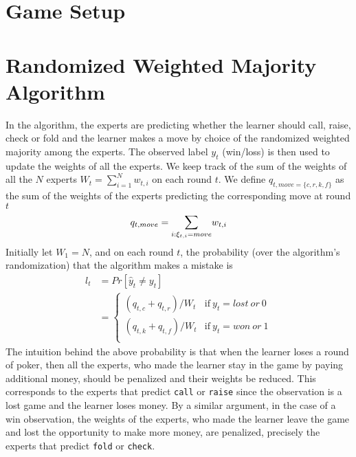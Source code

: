\documentclass[12pt]{article}
\begin{document}
\section{Game Setup}

\section{Randomized Weighted Majority Algorithm}
\label{sec:rwma}
\noindent In the algorithm, the experts are predicting whether the learner should call, raise, check
or fold and the learner makes a move by choice of the randomized weighted majority
among the experts. The observed label $y_t$ (win/loss) is then used to update
the weights of all the experts. We keep track of the sum of the weights of all the $N$ experts $W_t =
\sum_{i=1}^Nw_{t,i}$ on each round $t$. We define $q_{t,move=\{c,r,k,f\}}$ as the sum of the weights
of the experts predicting the corresponding move at round $t$ \ie \[q_{t,move}=\Sum_{i:\xi_{t,i}=move}w_{t,i}\]
Initially let $W_1 = N$,
and on each round $t$, the probability (over the algorithm's randomization) that the algorithm makes a mistake is
\begin{align}
l_t &= Pr[\hat{y}_t\neq y_t]\tag*{}\\
&=\begin{cases}
  	(q_{t,c} + q_{t, r})/W_t & \text{if}~y_{t}=lost~or~0\\
  	(q_{t,k} + q_{t, f})/W_t & \text{if}~y_{t}=won~or~1\\
	\end{cases}
\label{eq:prob-mistake}
\end{align}
\noindent The intuition behind the above probability is that when the learner loses
a round of poker, then all the experts, who made the learner stay in the game by paying
additional money, should be penalized and their weights be reduced. This corresponds to
the experts that predict \texttt{call} or \texttt{raise} since the observation is a lost
game and the learner loses money. By a similar argument, in the case of a win observation,
the weights of the experts, who made the learner leave the game and lost the opportunity
to make more money, are penalized, precisely the experts that predict \texttt{fold} or
\texttt{check}.\\
\end{document}
